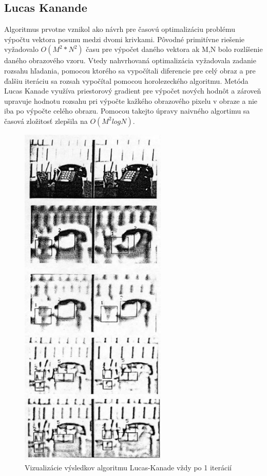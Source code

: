 \subsection{Lucas Kanande}
Algoritmus prvotne vznikol ako návrh pre časovú optimalizáciu problému výpočtu vektora posunu medzi dvomi krivkami.
Pôvodné primitívne riešenie vyžadovalo \begin{math} O(M^2 * N^2) \end{math} času pre výpočet daného vektora ak M,N bolo rozlíšenie daného obrazového vzoru.
Vtedy nahvrhovaná optimalizácia vyžadovala zadanie rozsahu hľadania, pomocou ktorého sa vypočítali diferencie pre celý obraz a pre ďalšiu iteráciu sa rozsah vypočítal pomocou horolezeckého algoritmu.
Metóda Lucas Kanade využíva priestorový gradient pre výpočet nových hodnôt a zároveň upravuje hodnotu rozsahu pri výpočte kažkého obrazového pixelu v obraze a nie iba po výpočte celého obrazu.
Pomocou takejto úpravy naivného algortimu sa časová zložitosť zlepšila na \begin{math} O(M^2 log N) \end{math}\cite{lucas-kanade}.

\begin{figure}[H]
  \centering
  \includegraphics[width=7cm]{pics/lukas-kanade.jpg}
  \caption{Vizualizácie výsledkov algoritmu Lucas-Kanade vždy po 1 iterácií\cite{lucas-kanade}}
\end{figure}
\vspace{10mm}

